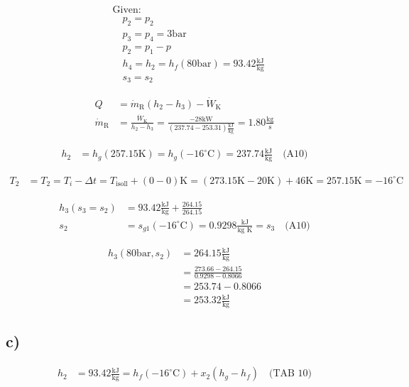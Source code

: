 \begin{align*}
&\text{Given:} \\
&\quad p_2 = p_2 \\
&\quad p_3 = p_4 = 3 \text{bar} \\
&\quad p_2 = p_1 - p \\
&\quad h_4 = h_2 = h_f (80 \text{bar}) = 93.42 \frac{\text{kJ}}{\text{kg}} \\
&\quad s_3 = s_2
\end{align*}

\begin{align*}
Q &= \dot{m}_{\text{R}} (h_2 - h_3) - \dot{W}_{\text{K}} \\
\dot{m}_{\text{R}} &= \frac{\dot{W}_{\text{K}}}{h_2 - h_3} = \frac{-28 \text{kW}}{(237.74 - 253.31) \frac{\text{kJ}}{\text{kg}}} = 1.80 \frac{\text{kg}}{\text{s}}
\end{align*}

\begin{align*}
h_2 &= h_g (257.15 \text{K}) = h_g (-16^\circ \text{C}) = 237.74 \frac{\text{kJ}}{\text{kg}} \quad \text{(A10)}
\end{align*}

\begin{align*}
T_2 &= T_2 = T_i - \Delta t = T_{\text{isoll}} + (0 - 0) \text{K} = (273.15 \text{K} - 20 \text{K}) + 46 \text{K} = 257.15 \text{K} = -16^\circ \text{C}
\end{align*}

\begin{align*}
h_3 (s_3 = s_2) &= 93.42 \frac{\text{kJ}}{\text{kg}} + \frac{264.15}{264.15} \\
s_2 &= s_{g1} (-16^\circ \text{C}) = 0.9298 \frac{\text{kJ}}{\text{kg K}} = s_3 \quad \text{(A10)}
\end{align*}

\begin{align*}
h_3 (80 \text{bar}, s_2) &= 264.15 \frac{\text{kJ}}{\text{kg}} \\
&= \frac{273.66 - 264.15}{0.9298 - 0.8066} \\
&= 253.74 - 0.8066 \\
&= 253.32 \frac{\text{kJ}}{\text{kg}}
\end{align*}

\subsection*{c)}

\begin{align*}
h_2 &= 93.42 \frac{\text{kJ}}{\text{kg}} = h_f (-16^\circ \text{C}) + x_2 (h_g - h_f) \quad \text{(TAB 10)}
\end{align*}

